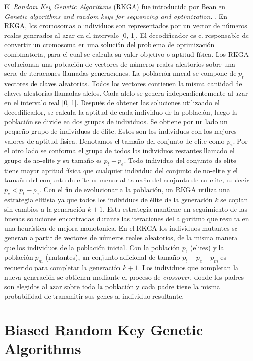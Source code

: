 El \textit{Random Key Genetic Algorithms} (RKGA) fue introducido por Bean en \textit{Genetic algorithms and random keys for sequencing and optimization.} \cite{Bean}. En RKGA, los cromosomas o individuos son representados por un vector de números reales generados al azar en el intervalo [0, 1]. El decodificador es el responsable de convertir un cromosoma en una solución del problema de optimización combinatoria, para el cual se calcula su valor objetivo o aptitud física. Los RKGA evolucionan una población de vectores de números reales aleatorios sobre una serie de iteraciones llamadas generaciones. La población inicial se compone de $p_t$ vectores de claves aleatorias. Todos los vectores contienen la misma cantidad de claves aleatorias llamadas alelos. Cada alelo se genera independientemente al azar en el intervalo real [0, 1]. Después de obtener las soluciones utilizando el decodificador, se calcula la aptitud de cada individuo de la población, luego la población se divide en dos grupos de individuos. Se obtiene por un lado un pequeño grupo de individuos de élite. Estos son los individuos con los mejores valores de aptitud física. Denotamos el tamaño del conjunto de elite como $p_e$. Por el otro lado se conforma el grupo de todos los individuos restantes llamado el grupo de no-elite y su tamaño es $p_t-p_e$. Todo individuo del conjunto de elite tiene mayor aptitud física que cualquier individuo del conjunto de no-elite y el tamaño del conjunto de elite es menor al tamaño del conjunto de no-elite, es decir $p_e<p_t-p_e$. Con el fin de evolucionar a la población, un RKGA utiliza una estrategia elitista ya que todos los individuos de élite de la generación $k$ se copian sin cambios a la generación $k+1$. Esta estrategia mantiene un seguimiento de las buenas soluciones encontradas durante las iteraciones del algoritmo que resulta en una heurística de mejora monotónica. En el RKGA los individuos mutantes se generan a partir de vectores de números reales aleatorios, de la misma manera que los individuos de la población inicial. Con la población $p_e$ (elites) y la población $p_m$ (mutantes), un conjunto adicional de tamaño $p_t - p_e - p_m$ es requerido para completar la generación $k+1$. Los individuos que completan la nueva generación se obtienen mediante el proceso de \textit{crossover}, donde los padres son elegidos al azar sobre toda la población y cada padre tiene la misma probabilidad de transmitir sus genes al individuo resultante.

\section{Biased Random Key Genetic Algorithms}\label{sec:brkga}


